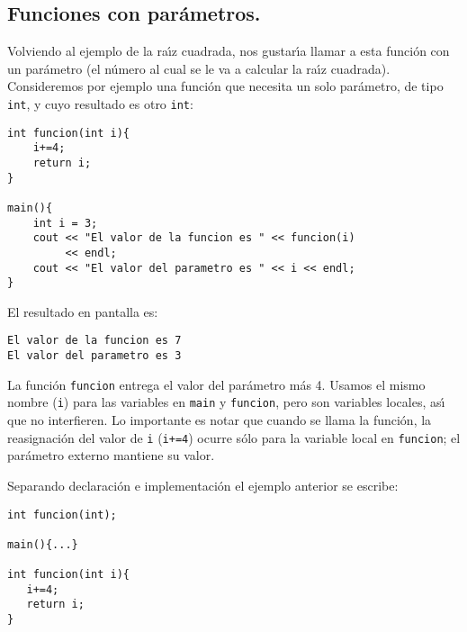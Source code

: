 \subsection{Funciones con par{\'a}metros.}
\label{parametros}

Volviendo al ejemplo de la ra{\'\i}z cuadrada, nos gustar{\'\i}a
llamar a esta funci{\'o}n con un par{\'a}metro (el n{\'u}mero al cual se le
va a calcular la ra{\'\i}z cuadrada). Consideremos por ejemplo una
funci\'on que necesita un solo par\'ametro, de tipo \verb+int+, y cuyo
resultado es otro \verb+int+\label{int_funcion_int}:
\begin{verbatim}
int funcion(int i){
    i+=4;
    return i;
}

main(){
    int i = 3;
    cout << "El valor de la funcion es " << funcion(i) 
         << endl;
    cout << "El valor del parametro es " << i << endl;
}
\end{verbatim}

El resultado en pantalla es:
\begin{verbatim}
El valor de la funcion es 7
El valor del parametro es 3
\end{verbatim}
La funci{\'o}n \verb+funcion+ entrega el valor del par{\'a}metro m{\'a}s 4.
Usamos el mismo nombre (\verb+i+) para las variables en \verb+main+ y
\verb+funcion+, pero son variables locales, as{\'\i} que no interfieren. Lo
importante es notar que cuando se llama la funci{\'o}n, la reasignaci{\'o}n
del valor de \verb+i+ (\verb-i+=4-) ocurre s{\'o}lo para la variable local
en \verb+funcion+; el par{\'a}metro externo mantiene su valor. 

Separando declaraci\'on e implementaci\'on el ejemplo anterior se
escribe:
\begin{verbatim}
int funcion(int);

main(){...}

int funcion(int i){
   i+=4;
   return i;
}
\end{verbatim}

